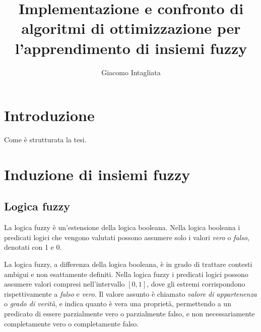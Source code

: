 \documentclass[a4paper,12pt]{report}
\begin{document}
\title{Implementazione e confronto di algoritmi di ottimizzazione per l'apprendimento di insiemi fuzzy}
\author{Giacomo Intagliata}
%
% 
%
\beforepreface

%
%
\afterpreface

%
\chapter*{Introduzione}
\label{Introduzione}
%
Come è strutturata la tesi.
% 


\chapter{Induzione di insiemi fuzzy}
\label{Capitolo 1}
\section{Logica fuzzy}
La logica fuzzy \cite{logica_fuzzy} è un'estensione della logica booleana.
Nella logica booleana i predicati logici che vengono valutati possono assumere solo i valori \textit{vero} o \textit{falso}, denotati con 1 e 0.

La logica fuzzy, a differenza della logica booleana, è in grado di trattare contesti ambigui e non esattamente definiti.
Nella logica fuzzy i predicati logici possono assumere valori compresi nell'intervallo $[0,1]$, dove gli estremi corrispondono rispettivamente a \textit{falso} e \textit{vero}.
Il valore assunto è chiamato \textit{valore di appartenenza} o \textit{grado di verità}, e indica quanto è vera una proprietà, permettendo a un predicato di essere parzialmente vero o parzialmente falso, e non necessariamente completamente vero o completamente falso.
\end{document}
